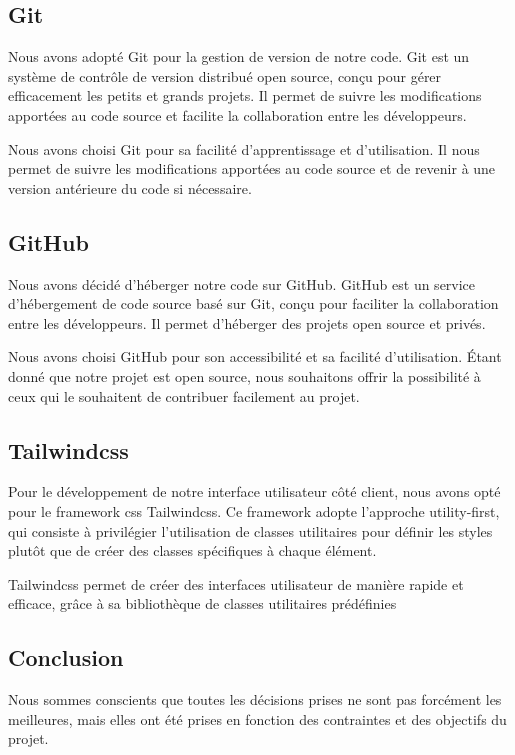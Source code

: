 \subsection*{Git}\label{subsec: conception-git}
Nous avons adopté Git pour la gestion de version de notre code. Git est un système de contrôle de version distribué open source, conçu pour gérer efficacement les petits et grands projets. Il permet de suivre les modifications apportées au code source et facilite la collaboration entre les développeurs.

Nous avons choisi Git pour sa facilité d'apprentissage et d'utilisation. Il nous permet de suivre les modifications apportées au code source et de revenir à une version antérieure du code si nécessaire.

\subsection*{GitHub}\label{subsec: conception-github}
Nous avons décidé d'héberger notre code sur GitHub. GitHub est un service d'hébergement de code source basé sur Git, conçu pour faciliter la collaboration entre les développeurs. Il permet d'héberger des projets open source et privés.

Nous avons choisi GitHub pour son accessibilité et sa facilité d'utilisation. Étant donné que notre projet est open source, nous souhaitons offrir la possibilité à ceux qui le souhaitent de contribuer facilement au projet.

\subsection*{Tailwindcss}\label{subsec: conception-tailwind}
Pour le développement de notre interface utilisateur côté client, nous avons opté pour le framework css Tailwindcss. Ce framework adopte l'approche utility-first, qui consiste à privilégier l'utilisation de classes utilitaires pour définir les styles plutôt que de créer des classes spécifiques à chaque élément.

Tailwindcss permet de créer des interfaces utilisateur de manière rapide et efficace, grâce à sa bibliothèque de classes utilitaires prédéfinies

\subsection*{Conclusion}\label{subsec: conception-conclusion-choix-techniques}
Nous sommes conscients que toutes les décisions prises ne sont pas forcément les meilleures, mais elles ont été prises en fonction des contraintes et des objectifs du projet.

